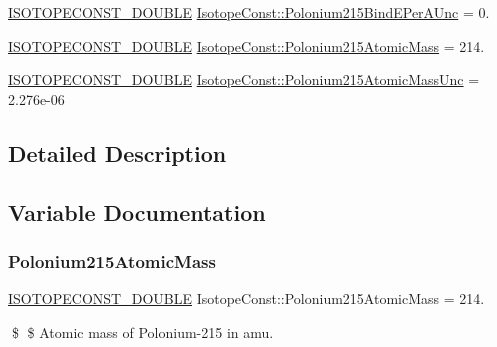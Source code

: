 \begin{DoxyCompactItemize}
\mbox{\hyperlink{group___isotope_const-_macros_ga8f45a7272ce02c0b4c65c44636ed719a}{I\+S\+O\+T\+O\+P\+E\+C\+O\+N\+S\+T\+\_\+\+D\+O\+U\+B\+LE}} \mbox{\hyperlink{group___isotope_const-_polonium-_po215_gaf53fa9351a8995df62d112ebd496f276}{Isotope\+Const\+::\+Polonium215\+Bind\+E\+Per\+A\+Unc}} = 0.
\item 
\mbox{\hyperlink{group___isotope_const-_macros_ga8f45a7272ce02c0b4c65c44636ed719a}{I\+S\+O\+T\+O\+P\+E\+C\+O\+N\+S\+T\+\_\+\+D\+O\+U\+B\+LE}} \mbox{\hyperlink{group___isotope_const-_polonium-_po215_ga2dab71a687d5fc084528626547173d9c}{Isotope\+Const\+::\+Polonium215\+Atomic\+Mass}} = 214.
\item 
\mbox{\hyperlink{group___isotope_const-_macros_ga8f45a7272ce02c0b4c65c44636ed719a}{I\+S\+O\+T\+O\+P\+E\+C\+O\+N\+S\+T\+\_\+\+D\+O\+U\+B\+LE}} \mbox{\hyperlink{group___isotope_const-_polonium-_po215_gaedfd1152169f4e4b2ca4d344ef93f5d3}{Isotope\+Const\+::\+Polonium215\+Atomic\+Mass\+Unc}} = 2.\+276e-\/06
\end{DoxyCompactItemize}


\subsection{Detailed Description}


\subsection{Variable Documentation}
\mbox{\label{group___isotope_const-_polonium-_po215_ga2dab71a687d5fc084528626547173d9c}} 
\subsubsection{\texorpdfstring{Polonium215\+Atomic\+Mass}{Polonium215AtomicMass}}
{\footnotesize\ttfamily \mbox{\hyperlink{group___isotope_const-_macros_ga8f45a7272ce02c0b4c65c44636ed719a}{I\+S\+O\+T\+O\+P\+E\+C\+O\+N\+S\+T\+\_\+\+D\+O\+U\+B\+LE}} Isotope\+Const\+::\+Polonium215\+Atomic\+Mass = 214.}

\$ \$ Atomic mass of Polonium-\/215 in amu. \mbox{\label{group___isotope_const-_polonium-_po215_gaedfd1152169f4e4b2ca4d344ef93f5d3}} 
